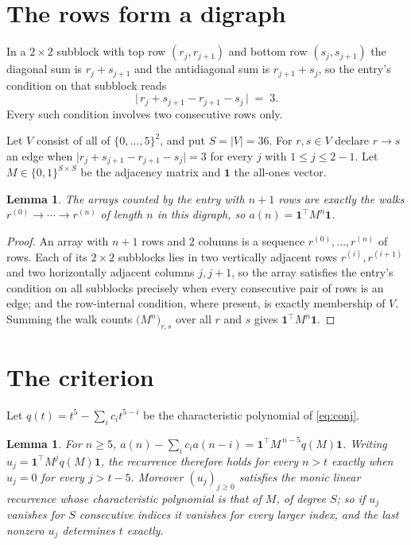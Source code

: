\documentclass[11pt,a4paper]{article}
\theoremstyle{plain}
\newtheorem{lemma}[theorem]{Lemma}
\theoremstyle{definition}
\begin{document}
\section{The rows form a digraph}

In a $2\times2$ subblock with top row $(r_j,r_{j+1})$ and bottom row $(s_j,s_{j+1})$ the
diagonal sum is $r_j+s_{j+1}$ and the antidiagonal sum is $r_{j+1}+s_j$, so the entry's
condition on that subblock reads
\[
\bigl|\,r_j+s_{j+1}-r_{j+1}-s_j\,\bigr|\;=\;3.
\]
Every such condition involves two consecutive rows only.

Let $V$ consist of all of $\{0,\dots,5\}^{2}$, and put $S=|V|=36$. For $r,s\in V$ declare $r\to s$ an edge
when $\bigl|r_j+s_{j+1}-r_{j+1}-s_j\bigr|=3$ for every $j$ with
$1\le j\le2-1$. Let $M\in\{0,1\}^{S\times S}$ be the adjacency matrix and $\mathbf{1}$
the all-ones vector.

\begin{lemma}\label{lem:walk}
The arrays counted by the entry with $n+1$ rows are exactly the walks
$r^{(0)}\to\cdots\to r^{(n)}$ of length $n$ in this digraph, so
$a(n)=\mathbf{1}^{\!\top}M^{n}\mathbf{1}$.
\end{lemma}

\begin{proof}
An array with $n+1$ rows and $2$ columns is a sequence $r^{(0)},\dots,r^{(n)}$ of
rows. Each of its $2\times2$ subblocks lies in two vertically adjacent rows
$r^{(i)},r^{(i+1)}$ and two horizontally adjacent columns $j,j+1$, so the array satisfies
the entry's condition on all subblocks precisely when every consecutive pair of rows is an
edge; and the row-internal condition, where present, is exactly membership of $V$. Summing
the walk counts $\bigl(M^{n}\bigr)_{r,s}$ over all $r$ and $s$ gives
$\mathbf{1}^{\!\top}M^{n}\mathbf{1}$.
\end{proof}

\section{The criterion}

Let $q(t)=t^{5}-\sum_i c_i t^{5-i}$ be the characteristic polynomial of
\eqref{eq:conj}.

\begin{lemma}\label{lem:crit}
For $n\ge5$,
$a(n)-\sum_i c_i a(n-i)=\mathbf{1}^{\!\top}M^{\,n-5}q(M)\mathbf{1}$. Writing
$u_j=\mathbf{1}^{\!\top}M^{j}q(M)\mathbf{1}$, the recurrence therefore holds for every
$n>t$ exactly when $u_j=0$ for every $j>t-5$. Moreover $(u_j)_{j\ge0}$ satisfies the
monic linear recurrence whose characteristic polynomial is that of $M$, of degree $S$; so
if $u_j$ vanishes for $S$ consecutive indices it vanishes for every larger index, and the
last nonzero $u_j$ determines $t$ exactly.
\end{lemma}
\end{document}
